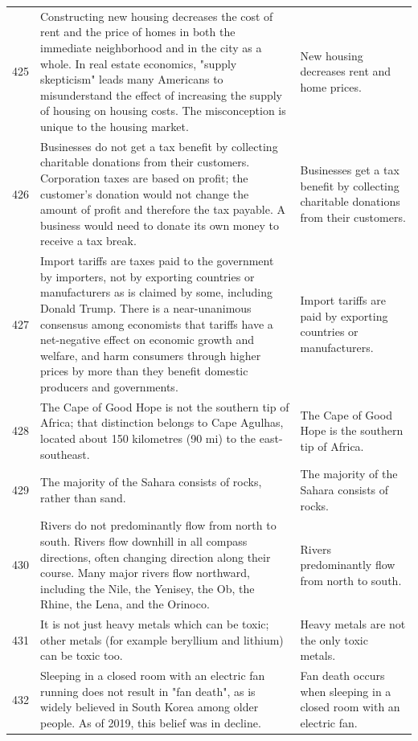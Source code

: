 \begin{tabular}{c|p{}|p{}}
425 & Constructing new housing decreases the cost of rent and the price of homes in both the immediate neighborhood and in the city as a whole. In real estate economics, "supply skepticism" leads many Americans to misunderstand the effect of increasing the supply of housing on housing costs. The misconception is unique to the housing market. & New housing decreases rent and home prices. \\
426 & Businesses do not get a tax benefit by collecting charitable donations from their customers. Corporation taxes are based on profit; the customer's donation would not change the amount of profit and therefore the tax payable. A business would need to donate its own money to receive a tax break. & Businesses get a tax benefit by collecting charitable donations from their customers. \\
427 & Import tariffs are taxes paid to the government by importers, not by exporting countries or manufacturers as is claimed by some, including Donald Trump. There is a near-unanimous consensus among economists that tariffs have a net-negative effect on economic growth and welfare, and harm consumers through higher prices by more than they benefit domestic producers and governments. & Import tariffs are paid by exporting countries or manufacturers. \\
428 & The Cape of Good Hope is not the southern tip of Africa; that distinction belongs to Cape Agulhas, located about 150 kilometres (90 mi) to the east-southeast. & The Cape of Good Hope is the southern tip of Africa. \\
429 & The majority of the Sahara consists of rocks, rather than sand. & The majority of the Sahara consists of rocks. \\
430 & Rivers do not predominantly flow from north to south. Rivers flow downhill in all compass directions, often changing direction along their course. Many major rivers flow northward, including the Nile, the Yenisey, the Ob, the Rhine, the Lena, and the Orinoco. & Rivers predominantly flow from north to south. \\
431 & It is not just heavy metals which can be toxic; other metals (for example beryllium and lithium) can be toxic too. & Heavy metals are not the only toxic metals. \\
432 & Sleeping in a closed room with an electric fan running does not result in "fan death", as is widely believed in South Korea among older people. As of 2019, this belief was in decline. & Fan death occurs when sleeping in a closed room with an electric fan. \\

\end{tabular}
